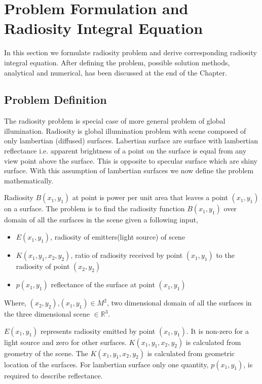 
\chapter{\label{ch:problemformulatio}Problem Formulation and Radiosity Integral Equation}

In this section we formulate radiosity problem and derive corresponding radiosity integral equation. After defining the problem, possible solution methods, analytical and numerical, has been discussed at the end of the Chapter.


\section{\label{ch:problemformulation}Problem Definition}
The radiosity problem is special case of more general problem of global illumination. Radiosity is global illumination problem with scene composed of only lambertian (diffused) surfaces. Labertian surface are surface with lambertian reflectance i.e. apparent brightness of a point on the surface is equal from any view point above the surface. This is opposite to specular surface which are shiny surface. With this assumption of lambertian surfaces we now define the problem mathematically.

Radiosity $B(x_1,y_1)$ at point is power per unit area that leaves a point $(x_1,y_1)$ on a surface. The problem is to find the radiosity function  $B(x_1,y_1)$ over domain of all the surfaces in the scene given a following input,
\begin{itemize}
\item $E(x_1,y_1)$, radiosity of emitters(light source) of scene
\item $K(x_1,y_1,x_2,y_2)$, ratio of radiosity received by point $(x_1,y_1)$ to the radiosity of  point $(x_2,y_2)$\\
\item $p(x_1,y_1)$ reflectance of the surface at point $(x_1,y_1)$\\

\end{itemize}
Where, $(x_2,y_2)$,$(x_1,y_1)  \in  M^2$, two dimensional domain of all the surfaces in the  three dimensional scene $\in \mathbb{R}^3$.

$E(x_1,y_1)$ represents radiosity emitted by point $(x_1,y_1)$. It is non-zero for a light source and zero for other surfaces. $K(x_1,y_1,x_2,y_2)$ is calculated from geometry of the scene. The $K(x_1,y_1,x_2,y_2)$ is calculated from geometric location of the surfaces. For lambertian surface only one quantity,  $p(x_1,y_1)$, is required to describe reflectance.

